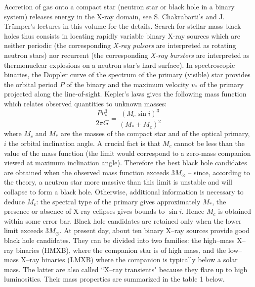 \documentclass{lamuphys}
\begin{document}
Accretion of gas onto a compact star (neutron star or black hole in 
a binary system) releases energy in the X-ray domain, see S. 
Chakrabarti's and J. Tr\"umper's lectures in this volume for the details. 
Search for stellar mass black holes thus consists in locating rapidly 
variable binary 
X-ray sources which are neither periodic (the corresponding {\it X-ray 
pulsars} 
are interpreted as rotating neutron stars) nor recurrent (the 
corresponding {\it X-ray bursters} are interpreted as thermonuclear 
explosions on a neutron star's hard surface). In spectroscopic 
binaries, the Doppler curve of the spectrum of the primary (visible) star 
provides the orbital period $P$ of the binary and the maximum 
velocity $v_{*}$ of 
the primary projected along the line-of-sight. Kepler's laws 
gives the following mass function which relates observed quantities to 
unknown masses: 
\begin{equation}
        \frac{Pv_{*}^3}{2 \pi G} = \frac{(M_{c}\sin i)^{3}}{(M_{*}+M_{c})^{2}}
        \label{luminet:15}
\end{equation}
where $M_{c}$ and $M_{*}$ are the masses of the compact star and of the 
optical primary, $i$ the orbital inclination angle.
A crucial fact is that $M_{c}$ cannot be less than the value of the 
mass function (the limit would correspond to a zero-mass companion 
viewed at maximum inclination angle). Therefore the best black hole 
candidates are obtained when the observed mass function exceeds 
$3 M_{\odot}$ -- since, according to the theory, a 
neutron star more massive than this limit is unstable and will 
collapse to form a black hole. Otherwise, additional information is 
necessary to deduce $M_{c}$: the spectral 
type of the primary gives approximately $M_{*}$, the presence or 
absence of X-ray eclipses gives bounds to $\sin i$. Hence $M_{c}$ is 
obtained within some error bar. Black hole candidates are retained 
only when the lower limit exceeds $3 M_{\odot}$. At present day, 
about ten binary X--ray 
sources provide good black hole candidates. They can be divided into 
two families: the high--mass X--ray binaries (HMXB), where the 
companion star is of high mass, and the low--mass X--ray binaries 
(LMXB) where the companion is typically below a solar mass. The latter 
are also called ``X--ray transients" because they flare up to high 
luminosities. Their mass properties are summarized in 
the table 1 below.
\end{document}
